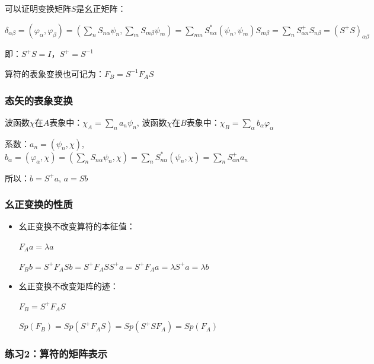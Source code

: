 可以证明变换矩阵$S$是幺正矩阵：


$\delta _{\alpha \beta } = \left( {\varphi _\alpha  ,\varphi _\beta
} \right) = \left( {\sum\limits_n {S_{n\alpha } \psi _n }
,\sum\limits_m {S_{m\beta } \psi _m } } \right) = \sum\limits_{nm}
{S_{n\alpha }^* \left( {\psi _n ,\psi _m } \right)S_{m\beta } }  =
\sum\limits_n {S_{\alpha n}^ +  S_{n\beta } }  = \left( {S^ +  S}
\right)_{\alpha \beta } $

即：$S^ +  S = I$，$S^ +   = S^{ - 1} $

算符的表象变换也可记为：$F_B  = S^{ - 1} F_A S$



\subsubsection{态矢的表象变换}

波函数$\chi$在$A$表象中：$\chi _A  = \sum\limits_n {a_n \psi _n } $, 波函数$\chi$在$B$表象中：$\chi _B  = \sum\limits_\alpha  {b_\alpha  \varphi _\alpha  } $

系数：$a_n  = \left( {\psi _n ,\chi } \right)$, $b_\alpha   = \left( {\varphi _\alpha  ,\chi } \right) = \left( {\sum\limits_n {S_{n\alpha } \psi _n } ,\chi } \right) = \sum\limits_n {S_{n\alpha }^* \left( {\psi _n ,\chi } \right)}  = \sum\limits_n {S_{\alpha n}^ +  a_n } $

所以：$b = S^ +  a$, $a = Sb$

\subsubsection{幺正变换的性质}

\begin{itemize}
    \item 幺正变换不改变算符的本征值：

$F_A a = \lambda a$

$F_B b = S^ +  F_A Sb = S^ +  F_A SS^ +  a = S^ +  F_A a = \lambda S^ +  a = \lambda b$

    \item 幺正变换不改变矩阵的迹：

$F_B  = S^ +  F_A S$

$Sp\left( {F_B } \right) = Sp\left( {S^ +  F_A S} \right) = Sp\left( {S^ +  SF_A } \right) = Sp\left( {F_A } \right)$
   \end{itemize}

\subsubsection*{练习2：算符的矩阵表示}

